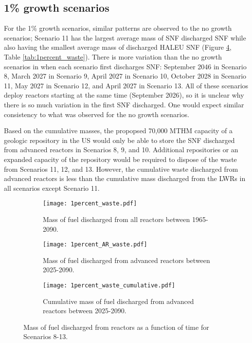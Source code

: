 \subsection{1\% growth scenarios}
For the 1\% growth scenarios, similar patterns are observed to the 
no growth scenarios; Scenario 11 
has the largest average mass of \gls{SNF} discharged \gls{SNF} while also 
having the smallest average mass of discharged \gls{HALEU} \gls{SNF} 
(Figure \ref{fig:1percent_waste}, Table \ref{tab:1percent_waste}). There 
is more variation than the no growth scenarios in when each scenario 
first discharges \gls{SNF}: 
September 2046 in Scenario 8, March 2027 in Scenario 9, April 2027 in 
Scenario 10, October 2028 in Scenario 11, May 2027 in Scenario 12, and 
April 2027 in Scenario 13. All of these scenarios deploy reactors starting 
at the same time (September 2026), so it is unclear why there is so much 
variation in the first \gls{SNF} discharged. One would expect similar 
consistency to what was observed for the no growth scenarios. 

Based on the cumulative masses, the propopsed 70,000 MTHM capacity of 
a geologic repository in the US would only be able to store the \gls{SNF} 
discharged from advanced reactors in Scenarios 8, 9, and 10. Additional 
repositories or an expanded capacity of the repository would be required 
to dispose of the waste from Scenarios 11, 12, and 13. However, the 
cumulative waste discharged from advanced reactors is less than the 
cumulative mass discharged from the \glspl{LWR} in all scenarios except 
Scenario 11. 

\begin{figure}
    \centering
    \begin{subfigure}[b]{0.45\textwidth}
        \centering
        \texttt{[image: 1percent\_waste.pdf]}
        \caption{Mass of fuel discharged from all reactors between 
        1965-2090.}
        \label{fig:1percent_all_waste}
    \end{subfigure}
    \hfill
    \begin{subfigure}[b]{0.45\textwidth}
        \centering
        \texttt{[image: 1percent\_AR\_waste.pdf]}
        \caption{Mass of fuel discharged from advanced reactors 
        between 2025-2090.}
        \label{fig:1percent_AR_waste}
    \end{subfigure}
    \begin{subfigure}[b]{0.45\textwidth}
        \centering
        \texttt{[image: 1percent\_waste\_cumulative.pdf]}
        \caption{Cumulative mass of fuel discharged from advanced reactors 
        between 2025-2090.}
        \label{fig:1percent_waste_cumulative}
    \end{subfigure}
       \caption{Mass of fuel discharged from reactors 
       as a function of time for Scenarios 8-13. }
       \label{fig:1percent_waste}
\end{figure}

